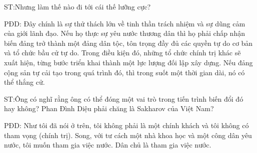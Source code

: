ST:Nhưng làm thế nào đi tới cái thế lưỡng cực?

PĐD: Đây chính là sự thử thách lớn về tinh thần trách nhiệm và sự dũng cảm của giới lãnh đạo. Nếu họ thực sự yêu nước thương dân thì họ phải chấp nhận biến đảng trở thành một đảng dân tộc, tôn trọng đầy đủ các quyền tự do cơ bản và tổ chức bầu cử tự do. Trong điều kiện đó, những tổ chức chính trị khác sẽ xuất hiện, từng bước triển khai thành một lực lượng đối lập xây dựng. Nếu đảng cộng sản tự cải tạo trong quá trình đó, thì trong suốt một thời gian dài, nó có thể thắng cử.

ST:Ông có nghĩ rằng ông có thể đóng một vai trò trong tiến trình biến đổi đó hay không? Phan Đình Diệu phải chăng là Sakharov của Việt Nam?

PĐD: Như tôi đã nói ở trên, tôi không phải là một chính khách và tôi không có tham vọng (chính trị). Song, với tư cách một nhà khoa học và một công dân yêu nước, tôi muốn tham gia việc nước. Dân chủ là tham gia việc nước.


\paragraph{}